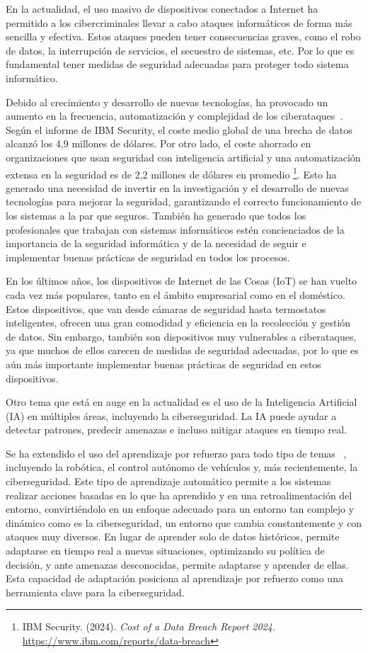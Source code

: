 
En la actualidad, el uso masivo de dispositivos conectados a Internet ha permitido a los cibercriminales llevar a cabo ataques informáticos de forma más sencilla y efectiva. Estos ataques pueden tener consecuencias graves, como el robo de datos, la interrupción de servicios, el secuestro de sistemas, etc. Por lo que es fundamental tener medidas de seguridad adecuadas para proteger todo sistema informático.

Debido al crecimiento y desarrollo de nuevas tecnologías, ha provocado un aumento en la frecuencia, automatización y complejidad de los ciberataques~\cite{Li2021}. Según el informe de IBM Security, el coste medio global de una brecha de datos alcanzó los 4,9 millones de dólares. Por otro lado, el coste ahorrado en organizaciones que usan seguridad con inteligencia artificial y una automatización extensa en la seguridad es de 2,2 millones de dólares en promedio \footnote{IBM Security. (2024). \textit{Cost of a Data Breach Report 2024}. \url{https://www.ibm.com/reports/data-breach}}. Esto ha generado una necesidad de invertir en la investigación y el desarrollo de nuevas tecnologías para mejorar la seguridad, garantizando el correcto funcionamiento de los sistemas a la par que seguros. También ha generado que todos los profesionales que trabajan con sistemas informáticos estén concienciados de la importancia de la seguridad informática y de la necesidad de seguir e implementar buenas prácticas de seguridad en todos los procesos.

En los últimos años, los dispositivos de Internet de las Cosas (IoT) se han vuelto cada vez más populares, tanto en el ámbito empresarial como en el doméstico. Estos dispositivos, que van desde cámaras de seguridad hasta termostatos inteligentes, ofrecen una gran comodidad y eficiencia en la recolección y gestión de datos. Sin embargo, también son dispositivos muy vulnerables a ciberataques, ya que muchos de ellos carecen de medidas de seguridad adecuadas, por lo que es aún más importante implementar buenas prácticas de seguridad en estos dispositivos.

Otro tema que está en auge en la actualidad es el uso de la Inteligencia Artificial (IA) en múltiples áreas, incluyendo la ciberseguridad. La IA puede ayudar a detectar patrones, predecir amenazas e incluso mitigar ataques en tiempo real.

Se ha extendido el uso del aprendizaje por refuerzo para todo tipo de temas ~\cite{Matsuo2022}, incluyendo la robótica, el control autónomo de vehículos y, más recientemente, la ciberseguridad. Este tipo de aprendizaje automático permite a los sistemas realizar acciones basadas en lo que ha aprendido y en una retroalimentación del entorno, convirtiéndolo en un enfoque adecuado para un entorno tan complejo y dinámico como es la ciberseguridad, un entorno que cambia constantemente y con ataques muy diversos.
En lugar de aprender solo de datos históricos, permite adaptarse en tiempo real a nuevas situaciones, optimizando su política de decisión, y ante amenazas desconocidas, permite adaptarse y aprender de ellas. Esta capacidad de adaptación posiciona al aprendizaje por refuerzo como una herramienta clave para la ciberseguridad.

